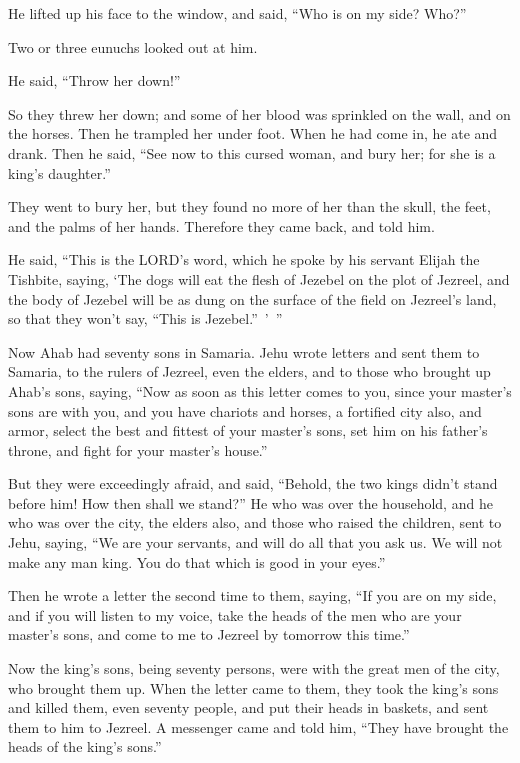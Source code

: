 \myverse{}He lifted up his face to the window, and said, “Who is on my
side? Who?”

Two or three eunuchs looked out at him.

\myverse{}He said, “Throw her down!”

So they threw her down; and some of her blood was sprinkled on the wall, and on the horses.
Then he trampled her under foot.
\myverse{}When he had come in, he ate and drank. Then he said, “See now to this cursed
woman, and bury her; for she is a king’s daughter.”

\myverse{}They went to bury her, but they found no more of her than the
skull, the feet, and the palms of her hands.
\myverse{}Therefore they came back, and told him.

He said, “This is the LORD’s word, which he spoke by his servant Elijah the Tishbite, saying,
‘The dogs will eat the flesh of Jezebel on the plot of Jezreel,
\myverse{}and the body of Jezebel will be as dung on the surface of the field on Jezreel’s
land, so that they won’t say, “This is Jezebel.” ’ ”


\mychapter{} \myverse*{}Now Ahab had seventy sons in Samaria. Jehu wrote letters and sent
them to Samaria, to the rulers of Jezreel, even the elders, and to those who brought up Ahab’s sons, saying,
\myverse{}“Now as soon as this letter comes to you, since your master’s sons are with
you, and you have chariots and horses, a fortified city also, and armor,
\myverse{}select the best and fittest of your master’s sons, set him on his father’s
throne, and fight for your master’s house.”

\myverse{}But they were exceedingly afraid, and said, “Behold, the two kings
didn’t stand before him! How then shall we stand?”
\myverse{}He who was over the household, and he who was over the city, the elders also,
and those who raised the children, sent to Jehu, saying, “We are your servants, and will do all that you
ask us. We will not make any man king. You do that which is good in your eyes.”

\myverse{}Then he wrote a letter the second time to them, saying, “If you
are on my side, and if you will listen to my voice, take the heads of the men who are your master’s sons,
and come to me to Jezreel by tomorrow this time.”

Now the king’s sons, being seventy persons, were with the great men of the city, who brought
them up.
\myverse{}When the letter came to them, they took the king’s sons and killed them, even
seventy people, and put their heads in baskets, and sent them to him to Jezreel.
\myverse{}A messenger came and told him, “They have brought the heads of the king’s sons.”

